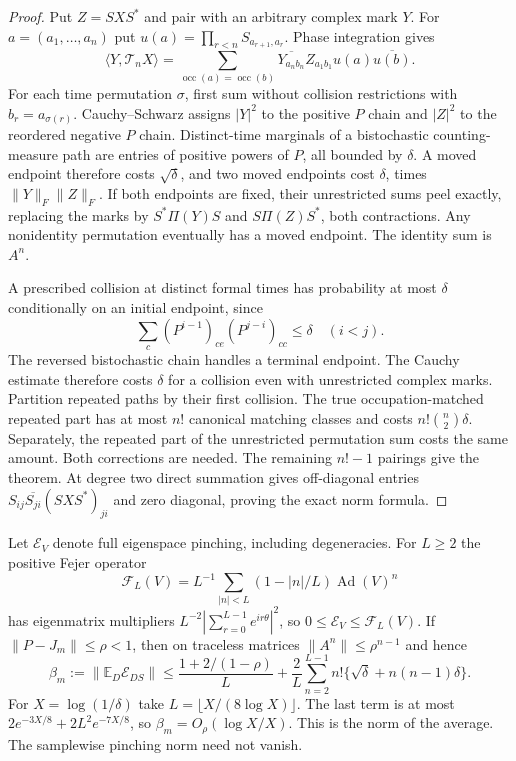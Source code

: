 \begin{proof}
Put $Z=SXS^*$ and pair with an arbitrary complex mark $Y$.
For $a=(a_1,\ldots,a_n)$ put
$u(a)=\prod_{r<n}S_{a_{r+1},a_r}$. Phase integration gives
\[
 \langle Y,\mathcal T_nX\rangle
 =\sum_{\operatorname{occ}(a)=\operatorname{occ}(b)}
 \overline{Y_{a_nb_n}}Z_{a_1b_1}u(a)\overline{u(b)}.
\]
For each time permutation $\sigma$, first sum without collision restrictions
with $b_r=a_{\sigma(r)}$. Cauchy--Schwarz assigns $|Y|^2$ to the
positive $P$ chain and $|Z|^2$ to the reordered negative $P$ chain.
Distinct-time marginals of a bistochastic counting-measure path are
entries of positive powers of $P$, all bounded by $\delta$. A moved
endpoint therefore costs $\sqrt\delta$, and two moved endpoints cost
$\delta$, times $\|Y\|_F\|Z\|_F$. If both endpoints are fixed,
their unrestricted sums peel exactly, replacing the marks by
$S^*\Pi(Y)S$ and $S\Pi(Z)S^*$, both contractions. Any nonidentity
permutation eventually has a moved endpoint. The identity sum is $A^n$.

A prescribed collision at distinct formal times has probability at most
$\delta$ conditionally on an initial endpoint, since
\[
 \sum_c(P^{i-1})_{ce}(P^{j-i})_{cc}\le\delta\quad(i<j).
\]
The reversed bistochastic chain handles a terminal endpoint. The Cauchy
estimate therefore costs $\delta$ for a collision even with unrestricted
complex marks. Partition repeated paths by their first collision.
The true occupation-matched repeated part has at most $n!$ canonical
matching classes and costs $n!\binom n2\delta$. Separately, the repeated
part of the unrestricted permutation sum costs the same amount. Both
corrections are needed. The remaining $n!-1$ pairings give the theorem.
At degree two direct summation gives off-diagonal entries
$S_{ij}\overline{S_{ji}}(SXS^*)_{ji}$ and zero diagonal, proving the
exact norm formula.
\end{proof}

Let $\mathcal E_V$ denote full eigenspace pinching, including degeneracies.
For $L\ge2$ the positive Fejer operator
\[
 \mathcal F_L(V)=L^{-1}\sum_{|n|<L}(1-|n|/L)\operatorname{Ad}(V)^n
\]
has eigenmatrix multipliers
$L^{-2}|\sum_{r=0}^{L-1}e^{ir\theta}|^2$, so
$0\le\mathcal E_V\le\mathcal F_L(V)$. If
$\|P-J_m\|\le\rho<1$, then on traceless matrices
$\|A^n\|\le\rho^{n-1}$ and hence
\[
 \beta_m:=\|\mathbb E_D\mathcal E_{DS}\|
 \le\frac{1+2/(1-\rho)}L+
 \frac2L\sum_{n=2}^{L-1}n!\{\sqrt\delta+n(n-1)\delta\}.
\]
For $X=\log(1/\delta)$ take $L=\lfloor X/(8\log X)\rfloor$.
The last term is at most
$2e^{-3X/8}+2L^2e^{-7X/8}$, so
$\beta_m=O_\rho(\log X/X)$. This is the norm of the average.
The samplewise pinching norm need not vanish.

